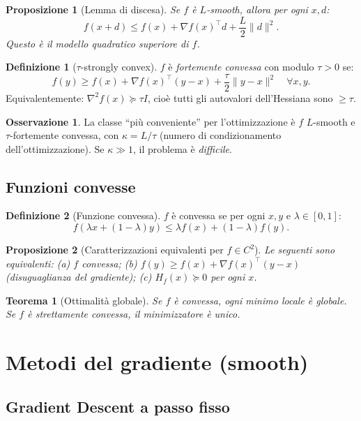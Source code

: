 \documentclass[11pt, a4paper, twoside]{book}
\theoremstyle{definition}
\newtheorem{defn}{Definizione}[chapter]
\newtheorem{remark}{Osservazione}[chapter]
\theoremstyle{plain}
\newtheorem{thm}{Teorema}[chapter]
\newtheorem{prop}{Proposizione}[chapter]
\theoremstyle{remark}
\begin{document}
\begin{prop}[Lemma di discesa]
Se $f$ è $L$-smooth, allora per ogni $x, d$:
\[
  f(x + d) \leq f(x) + \nabla f(x)^\top d + \frac{L}{2}\|d\|^2.
\]
Questo è il \emph{modello quadratico superiore} di $f$.
\end{prop}

\begin{defn}[$\tau$-strongly convex]
$f$ è \emph{fortemente convessa} con modulo $\tau > 0$ se:
\[
  f(y) \geq f(x) + \nabla f(x)^\top(y-x) + \frac{\tau}{2}\|y-x\|^2 \quad \forall x, y.
\]
Equivalentemente: $\nabla^2 f(x) \succeq \tau I$, cioè tutti gli autovalori dell'Hessiana sono $\geq \tau$.
\end{defn}

\begin{remark}
La classe ``più conveniente'' per l'ottimizzazione è $f$ $L$-smooth e $\tau$-fortemente convessa, con $\kappa = L/\tau$ (numero di condizionamento dell'ottimizzazione). Se $\kappa \gg 1$, il problema è \emph{difficile}.
\end{remark}

\subsection{Funzioni convesse}

\begin{defn}[Funzione convessa]
$f$ è convessa se per ogni $x, y$ e $\lambda \in [0,1]$:
\[
  f(\lambda x + (1-\lambda) y) \leq \lambda f(x) + (1-\lambda) f(y).
\]
\end{defn}

\begin{prop}[Caratterizzazioni equivalenti per $f \in C^2$]
Le seguenti sono equivalenti: (a) $f$ convessa; (b) $f(y) \geq f(x) + \nabla f(x)^\top(y-x)$ (disuguaglianza del gradiente); (c) $H_f(x) \succeq 0$ per ogni $x$.
\end{prop}

\begin{thm}[Ottimalità globale]
Se $f$ è convessa, ogni minimo locale è globale. Se $f$ è strettamente convessa, il minimizzatore è unico.
\end{thm}

\section{Metodi del gradiente (smooth)}

\subsection{Gradient Descent a passo fisso}
\end{document}
